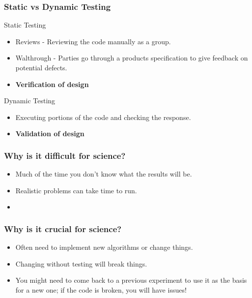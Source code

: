 \documentclass{beamer}
\begin{document}
\begin{frame}
\frametitle{Static vs Dynamic Testing}
\begin{block}{Static Testing}
    \begin{itemize}
        \item Reviews - Reviewing the code manually as a group.
        \item Walthrough - Parties go through a products specification to give feedback on potential defects.
        \item \textbf{Verification of design}
    \end{itemize}
\end{block}

\begin{block}{Dynamic Testing}
    \begin{itemize}
        \item Executing portions of the code and checking the response.
        \item \textbf{Validation of design}
    \end{itemize}
\end{block}
\end{frame}

\begin{frame}
\frametitle{Why is it difficult for science?}
\begin{itemize}
    \item Much of the time you don't know what the results will be.
    \item Realistic problems can take time to run.
    \item 
\end{itemize}
\end{frame}

\begin{frame}
    \frametitle{Why is it crucial for science?}
    \begin{itemize}
        \item Often need to implement new algorithms or change things.
        \item Changing without testing will break things.
        \item You might need to come back to a previous experiment to use it as the basis for a new one; if the code is broken, you will have issues!
    \end{itemize}
\end{frame}
\end{document}
